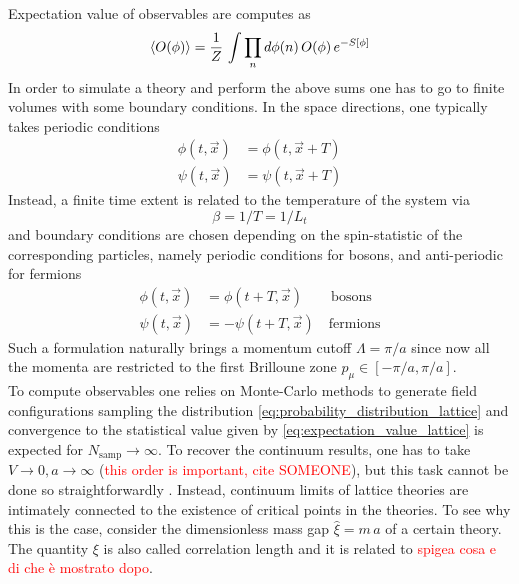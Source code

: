Expectation value of observables are computes as
\begin{equation}
    \left\langle O(\phi) \right\rangle  = \frac{1}{Z} \, \int \prod_n d\phi(n) \, O(\phi) \, e^{-S[\phi]}
    \label{eq:expectation_value_lattice}
\end{equation}
In order to simulate a theory and perform the above sums one has to go to finite volumes with some boundary conditions. In the space directions, one typically takes periodic conditions 
\begin{equation*}
    \begin{aligned}
        \phi(t, \vec x) &= \phi(t, \vec x + T) \\
        \psi(t, \vec x) &= \psi(t, \vec x + T)
    \end{aligned}
\end{equation*}
Instead, a finite time extent is related to the temperature of the system \cite{le_bellac_1996,rothe_LGT} via
\begin{equation*}
    \beta = 1/T = 1/L_t
\end{equation*}
and boundary conditions are chosen depending on the spin-statistic of the corresponding particles, namely periodic conditions for bosons, and anti-periodic for fermions
\begin{equation*}
    \begin{aligned}
        \phi(t, \vec x) &= \phi(t + T, \vec x) \qquad \text{bosons}\\
        \psi(t, \vec x) &= -\psi(t + T, \vec x) \quad \text{fermions}
    \end{aligned}
\end{equation*}
Such a formulation naturally brings a momentum cutoff $\Lambda = \pi/a$ since now all the momenta are restricted to the first Brilloune zone $p_\mu \in [-\pi/a, \pi/a]$. \\
To compute observables one relies on Monte-Carlo methods to generate field configurations sampling the distribution \eqref{eq:probability_distribution_lattice} and convergence to the statistical value given by \eqref{eq:expectation_value_lattice} is expected for $N_\text{samp} \to \infty$. To recover the continuum results, one has to take $V \to 0, a \to \infty$ (\textcolor{red}{this order is important, cite SOMEONE}), but this task cannot be done so straightforwardly \cite{rothe_LGT}.
Instead, continuum limits of lattice theories are intimately connected to the existence of critical points in the theories. To see why this is the case, consider the dimensionless mass gap $\hat\xi = m \, a$ of a certain theory. The quantity $\xi$ is also called correlation length and it is related to \textcolor{red}{spigea cosa e di che è mostrato dopo}. 
